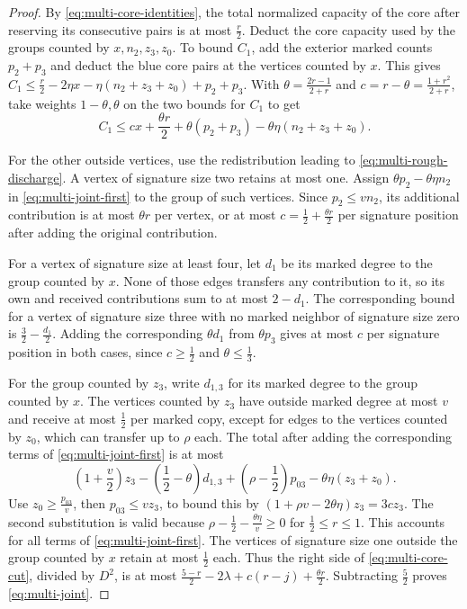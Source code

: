 \begin{proof}
By \eqref{eq:multi-core-identities}, the total normalized capacity
of the core after reserving its consecutive pairs is at most
$\frac{r}{2}$. Deduct the core capacity used by the groups counted
by $x,n_2,z_3,z_0$. To bound $C_1$, add the exterior marked
counts $p_2+p_3$ and deduct the blue core pairs at the vertices
counted by $x$. This gives
$C_1\le\frac{r}{2}-2\eta x-\eta(n_2+z_3+z_0)+p_2+p_3$.
With $\theta=\frac{2r-1}{2+r}$ and $c=r-\theta=\frac{1+r^2}{2+r}$,
take weights $1-\theta,\theta$ on the two bounds for $C_1$ to get
\begin{equation}\label{eq:multi-joint-first}
 C_1\le cx+\frac{\theta r}{2}
     +\theta(p_2+p_3)-\theta\eta(n_2+z_3+z_0).
\end{equation}

For the other outside vertices, use the redistribution leading to
\eqref{eq:multi-rough-discharge}. A vertex of signature size two
retains at most one. Assign $\theta p_2-\theta\eta n_2$ in
\eqref{eq:multi-joint-first} to the group of such vertices. Since
$p_2\le v n_2$, its additional contribution is at most $\theta r$
per vertex, or at most $c=\frac{1}{2}+\frac{\theta r}{2}$ per signature
position after adding the original contribution.

For a vertex of signature size at least four, let $d_1$ be its
marked degree to the group counted by $x$. None of those edges
transfers any contribution to it, so its own and received
contributions sum to at most $2-d_1$. The corresponding bound for a
vertex of signature size three with no marked neighbor of signature
size zero is $\frac{3}{2}-\frac{d_1}{2}$. Adding the corresponding
$\theta d_1$ from $\theta p_3$ gives at most $c$ per signature
position in both cases, since $c\ge\frac{1}{2}$ and $\theta\le\frac{1}{3}$.

For the group counted by $z_3$, write $d_{1,3}$ for its marked
degree to the group counted by $x$. The vertices counted by $z_3$
have outside marked degree at most $v$ and receive at most
$\frac{1}{2}$ per marked copy, except for edges to the vertices
counted by $z_0$, which can transfer up to $\rho$ each. The total
after adding the corresponding terms of \eqref{eq:multi-joint-first}
is at most
\[
 \left(1+\frac{v}{2}\right)z_3
 -\left(\frac{1}{2}-\theta\right)d_{1,3}
 +\left(\rho-\frac{1}{2}\right)p_{03}-\theta\eta(z_3+z_0).
\]
Use $z_0\ge\frac{p_{03}}{v}$, then $p_{03}\le v z_3$, to
bound this by $(1+\rho v-2\theta\eta)z_3=3c z_3$. The second
substitution is valid because
$\rho-\frac{1}{2}-\frac{\theta\eta}{v}\ge0$ for $\frac{1}{2}\le r\le1$.
This accounts for all terms of \eqref{eq:multi-joint-first}.
The vertices of signature size one outside the group counted by
$x$ retain at most $\frac{1}{2}$ each. Thus the right side of
\eqref{eq:multi-core-cut}, divided by $D^2$, is at most
$\frac{5-r}{2}-2\lambda+c(r-j)+\frac{\theta r}{2}$.
Subtracting $\frac{5}{2}$ proves \eqref{eq:multi-joint}.

\end{proof}
